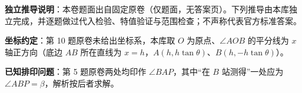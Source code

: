 

\begin{gktip}
\textbf{独立推导说明}：本卷题面出自固定原卷（仅题面，无答案页）。下列推导由本库独立完成，并逐题做过代入检验、特值验证与范围检查；不声称代表官方标准答案。

\textbf{坐标约定}：第 10 题原卷未给出坐标系，本库取 $O$ 为原点、$\angle AOB$ 的平分线为 $x$ 轴正方向（底边 $AB$ 所在直线为 $x=h$，$A(h,h\tan\theta)$、$B(h,-h\tan\theta)$）。

\textbf{已知排印问题}：第 5 题原卷两处均印作 $\angle BAP$，其中“在 $B$ 站测得”一处应为 $\angle ABP=\beta$，解析按后者求解。
\end{gktip}

